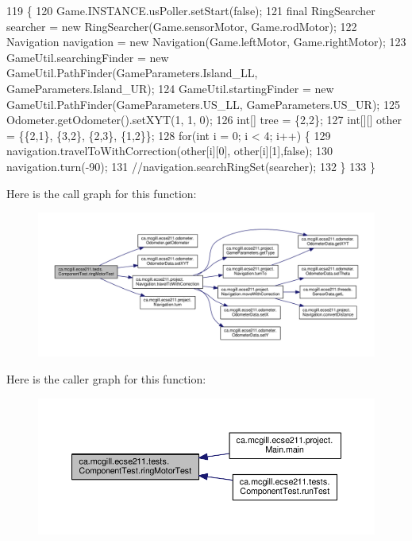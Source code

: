 \begin{DoxyCode}
119                                                                \{
120     Game.INSTANCE.usPoller.setStart(\textcolor{keyword}{false});
121     \textcolor{keyword}{final} RingSearcher searcher = \textcolor{keyword}{new} RingSearcher(Game.sensorMotor, Game.rodMotor);
122     Navigation navigation = \textcolor{keyword}{new} Navigation(Game.leftMotor, Game.rightMotor);
123     GameUtil.searchingFinder = \textcolor{keyword}{new} GameUtil.PathFinder(GameParameters.Island\_LL, GameParameters.Island\_UR);
124     GameUtil.startingFinder = \textcolor{keyword}{new} GameUtil.PathFinder(GameParameters.US\_LL, GameParameters.US\_UR);
125     Odometer.getOdometer().setXYT(1, 1, 0);
126     \textcolor{keywordtype}{int}[] tree = \{2,2\};
127     \textcolor{keywordtype}{int}[][] other = \{\{2,1\}, \{3,2\}, \{2,3\}, \{1,2\}\};
128     \textcolor{keywordflow}{for}(\textcolor{keywordtype}{int} i = 0; i < 4; i++) \{
129       navigation.travelToWithCorrection(other[i][0], other[i][1],\textcolor{keyword}{false});
130       navigation.turn(-90);
131       \textcolor{comment}{//navigation.searchRingSet(searcher);}
132     \}
133   \}
\end{DoxyCode}
Here is the call graph for this function\+:
\nopagebreak
\begin{figure}[H]
\begin{center}
\leavevmode
\includegraphics[width=350pt]{enumca_1_1mcgill_1_1ecse211_1_1tests_1_1_component_test_a1ecca45b47067d825683cf46dcf22b62_cgraph}
\end{center}
\end{figure}
Here is the caller graph for this function\+:
\nopagebreak
\begin{figure}[H]
\begin{center}
\leavevmode
\includegraphics[width=350pt]{enumca_1_1mcgill_1_1ecse211_1_1tests_1_1_component_test_a1ecca45b47067d825683cf46dcf22b62_icgraph}
\end{center}
\end{figure}
